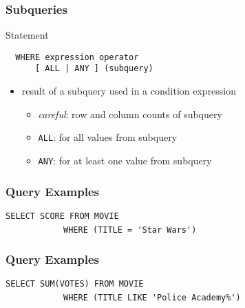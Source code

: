 \documentclass[dvipsnames]{beamer}
\theoremstyle{plain}
\begin{document}
\begin{frame}[fragile]
  \frametitle{Subqueries}

  \begin{block}{Statement}
    \begin{lstlisting}
  WHERE expression operator
      [ ALL | ANY ] (subquery)
    \end{lstlisting}
  \end{block}

  \begin{itemize}
    \item result of a subquery used in a condition expression
    \pause
    \begin{itemize}
      \item \emph{careful}: row and column counts of subquery
      \item \lstinline!ALL!: for all values from subquery
      \item \lstinline!ANY!: for at least one value from subquery
    \end{itemize}
  \end{itemize}

\end{frame}

\begin{frame}[fragile]
  \frametitle{Query Examples}

  \begin{example}
\lstinline!SELECT SCORE FROM MOVIE!\\
~~~~~~~~~~~~\lstinline!WHERE (TITLE = 'Star Wars')!
  \end{example}
\end{frame}

\begin{frame}[fragile]
  \frametitle{Query Examples}

  \begin{example}
\lstinline!SELECT SUM(VOTES) FROM MOVIE!\\
~~~~~~~~~~~~\lstinline!WHERE (TITLE LIKE 'Police Academy%')!
  \end{example}
\end{frame}
\end{document}
